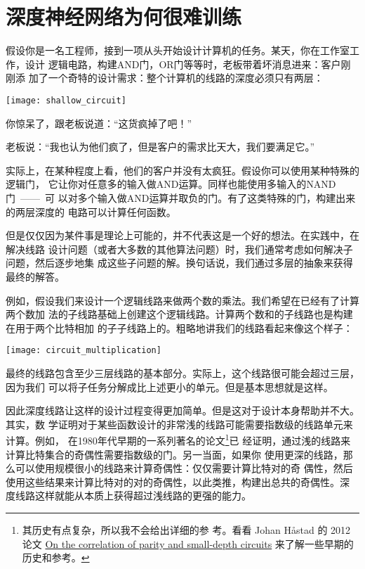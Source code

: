 
\chapter{深度神经网络为何很难训练}
\label{ch:WhyHardToTrain}

假设你是一名工程师，接到一项从头开始设计计算机的任务。某天，你在工作室工作，设计
逻辑电路，构建{\serif AND}门，{\serif OR}门等等时，老板带着坏消息进来：客户刚刚添
加了一个奇特的设计需求：整个计算机的线路的深度必须只有两层：
\begin{center}
  \texttt{[image: shallow\_circuit]}
\end{center}

你惊呆了，跟老板说道：“这货疯掉了吧！”
 
老板说：“我也认为他们疯了，但是客户的需求比天大，我们要满足它。”
 
实际上，在某种程度上看，他们的客户并没有太疯狂。假设你可以使用某种特殊的逻辑门，
它让你对任意多的输入做{\serif AND}运算。同样也能使用多输入的{\serif NAND}门~——~可
以对多个输入做{\serif AND}运算并取负的门。有了这类特殊的门，构建出来的两层深度的
电路可以计算任何函数。

但是仅仅因为某件事是理论上可能的，并不代表这是一个好的想法。在实践中，在解决线路
设计问题（或者大多数的其他算法问题）时，我们通常考虑如何解决子问题，然后逐步地集
成这些子问题的解。换句话说，我们通过多层的抽象来获得最终的解答。

例如，假设我们来设计一个逻辑线路来做两个数的乘法。我们希望在已经有了计算两个数加
法的子线路基础上创建这个逻辑线路。计算两个数和的子线路也是构建在用于两个比特相加
的子子线路上的。粗略地讲我们的线路看起来像这个样子：
\begin{center}
  \texttt{[image: circuit\_multiplication]}
\end{center}

最终的线路包含至少三层线路的基本部分。实际上，这个线路很可能会超过三层，因为我们
可以将子任务分解成比上述更小的单元。但是基本思想就是这样。
 
因此深度线路让这样的设计过程变得更加简单。但是这对于设计本身帮助并不大。其实，数
学证明对于某些函数设计的非常浅的线路可能需要指数级的线路单元来计算。例如，
在1980年代早期的一系列著名的论文\footnote{其历史有点复杂，所以我不会给出详细的参
  考。看看 Johan
  Håstad 的 2012 论文 \href{http://eccc.hpi-web.de/report/2012/137/}{On the
    correlation of parity and small-depth circuits} 来了解一些早期的历史和参考。}已
经证明，通过浅的线路来计算比特集合的奇偶性需要指数级的门。另一当面，如果你
使用更深的线路，那么可以使用规模很小的线路来计算奇偶性：仅仅需要计算比特对的奇
偶性，然后使用这些结果来计算比特对的对的奇偶性，以此类推，构建出总共的奇偶性。深
度线路这样就能从本质上获得超过浅线路的更强的能力。
 
